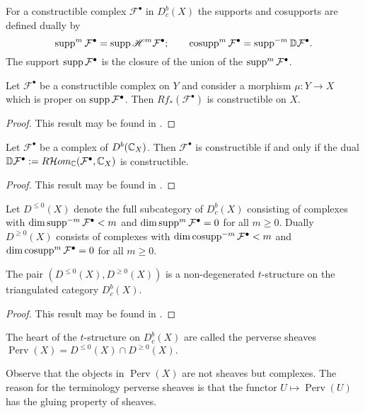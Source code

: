   For a constructible complex $\mathcal{F}^\bullet$ in $D^b_c(X)$ the supports and cosupports are defined dually by
  $$\operatorname{supp}^m\mathcal{F}^\bullet = \operatorname{supp} \mathscr{H}^m \mathcal{F}^\bullet; \qquad \operatorname{cosupp}^m\mathcal{F}^\bullet = \operatorname{supp}^{-m}\mathbb{D}\mathcal{F}^\bullet.$$
  The support $\operatorname{supp} \mathcal{F}^\bullet$ is the closure of the union of the $\operatorname{supp}^m\mathcal{F}^\bullet$.
  \begin{theorem}
    Let $\mathcal{F}^\bullet$ be a constructible complex on $Y$ and consider a morphism $\mu:Y\to X$ which is proper on $\operatorname{supp} \mathcal{F}^\bullet$. Then $Rf_*(\mathcal{F}^\bullet)$ is constructible on $X$.
  \end{theorem}
  \begin{proof}
    This result may be found in \cite[Chapter 4]{dimca2004sheaves}.
  \end{proof}
  \begin{theorem}
    Let $\mathcal{F}^\bullet$ be a complex of $D^b(\mathbb{C}_X)$. Then $\mathcal{F}^\bullet$ is constructible if and only if the dual $\mathbb{D}\mathcal{F}^\bullet := R \mathcal{H}om_{\mathbb{C}}(\mathcal{F}^\bullet,\mathbb{C}_X)$ is constructible.
  \end{theorem}
  \begin{proof}
    This result may be found in \cite[Chapter 4]{dimca2004sheaves}.
  \end{proof}
  Let $D^{\leq 0}(X)$ denote the full subcategory of $D^b_c(X)$ consisting of complexes with $\dim \operatorname{supp}^{-m} \mathcal{F}^\bullet < m$ and $\dim \operatorname{supp}^m \mathcal{F}^\bullet = 0$ for all $m\geq 0$.
  Dually $D^{\geq 0}(X)$ consists of complexes with $\dim \operatorname{cosupp}^{-m}\mathcal{F}^\bullet <m$ and $\dim \operatorname{cosupp}^m \mathcal{F}^\bullet = 0$ for all $m\geq 0$.
  \begin{proposition}
    The pair $(D^{\leq 0}(X), D^{\geq 0}(X))$ is a non-degenerated $t$-structure on the triangulated category $D^{b}_c(X)$.
  \end{proposition}
  \begin{proof}
    This result may be found in \cite[Chapter 5]{dimca2004sheaves}.
  \end{proof}
  \begin{definition}
    The heart of the $t$-structure on $D^b_c(X)$ are called the perverse sheaves $\operatorname{Perv}(X) = D^{\leq 0}(X)\cap D^{\geq 0}(X).$
  \end{definition}
  Observe that the objects in $\operatorname{Perv}(X)$ are not sheaves but complexes.
  The reason for the terminology perverse sheaves is that the functor $U\mapsto \operatorname{Perv}(U)$ has the gluing property of sheaves.
